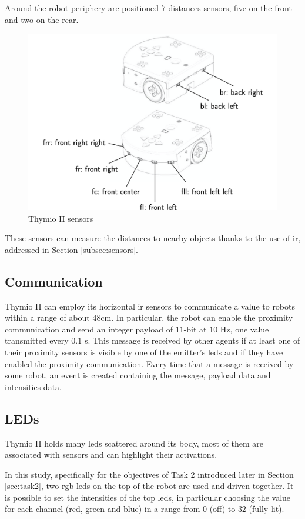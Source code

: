 Around the robot periphery are positioned $7$ distances sensors, five on the 
front and two on the rear. 
\begin{figure}[h!tb]
	\centering
	\includegraphics[width=.6\textwidth]{contents/images/thymio2x}
	\caption{Thymio II sensors}
	\label{fig:thymio sensors}
\end{figure}
These sensors can measure the distances to nearby objects thanks to the use 
of  \gls{ir}, addressed in Section \ref{subsec:sensors}.

\subsection{Communication}
\label{subsec:thymiocomm}

Thymio II can employ its horizontal \gls{ir} sensors to communicate a value 
to robots within a range of about $48$\gls{cm}. 
In particular, the robot can enable the proximity communication and send an 
integer payload of $11$-bit at $10$ \gls{Hz}, one value transmitted every $0.1$ 
\gls{s}. 
This message is received by other agents if at least one of their proximity sensors 
is visible by one of the emitter’s \glspl{led} and if they have enabled the proximity 
communication.
Every time that a message is received by some robot, an event is 
created containing the message, payload data and intensities data.

\subsection{LEDs}
\label{subsec:thymioled}

Thymio II holds many \glspl{led} scattered around its body, most of them are 
associated 
with sensors and can highlight their activations.

In this study, specifically for the objectives of Task 2 introduced later in Section 
\ref{sec:task2}, two \gls{rgb} \glspl{led} on the top of the robot are used and 
driven together.
It is possible to set the intensities of the top \glspl{led}, in particular choosing the 
value for each channel (red, green and blue) in a range from $0$ (off) to $32$ 
(fully lit).

